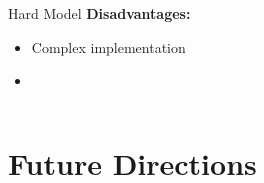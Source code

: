 \documentclass[10pt,t]{beamer}
\begin{document}
\begin{frame}
\begin{columns}
\begin{column}{0.5\textwidth}
\begin{exampleblock}{Hard Model }
                \textbf{Disadvantages:}
                \begin{itemize}
                    \item Complex implementation
                    \item[]
                \end{itemize}
            \end{exampleblock}
        \end{column}

    \end{columns}

\end{frame}


\section{Future Directions}
\end{document}
